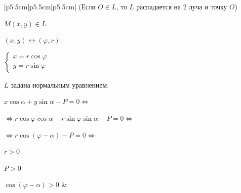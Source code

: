 \documentclass[twoside]{book}
\begin{document}
\begin{center}
\begin{longtable}[t]{|p{5.5cm}|p{5.5cm}|p{5.5cm}|}
        (Если \(O \in L\), то \(L\) распадается на 2 луча и точку \(O\))

        \(M(x, y) \in L\)

        \((x, y) \leftrightarrow (\varphi, r)\):

        \(
        \begin{cases}
            x = r \cos \varphi \\
            y = r \sin \varphi
        \end{cases}
        \)

        \(L\) задана нормальным уравнением:

        \small\(x \cos \alpha + y \sin \alpha - P = 0 \Leftrightarrow\)

        \scriptsize\(\Leftrightarrow r \cos \varphi \cos \alpha - r \sin \varphi \sin \alpha - P = 0 \Leftrightarrow\)

        \small\(\Leftrightarrow r \cos (\varphi - \alpha) - P = 0 \Leftrightarrow\)\normalsize


        \(r > 0\)

        \(P > 0\)

        \(\cos(\varphi - \alpha) > 0\)
         &
        \multicolumn{2}{p{11cm}}{

        Взаимное расположение прямой и плоскости в пространстве:

        \(\alpha: Ax + By + Cz + D = 0\), \(A^2 + B^2 + C^2 \neq 0\)

        \(L: \vec S = (l, m, n), M(x_0, y_0, z_0)\)

        \textbullet \(
        \left[\begin{array}{ll}
                  L \parallel \alpha \\
                  L \subset \alpha
              \end{array}\right .\)
        \(\Leftrightarrow \vec S \perp \vec N \Leftrightarrow \vec S \cdot \vec N = 0 \Leftrightarrow\)

        \(\)

        \(\Leftrightarrow Al + Bm + Cn = 0\)

        \textbullet \(L \subset \alpha \Leftrightarrow\)
        \(\begin{cases}
              \vec S \cdot \vec N = 0 \\
              M_0 \in \alpha
          \end{cases} \Leftrightarrow\)

}
\end{longtable}
\end{center}
\end{document}
